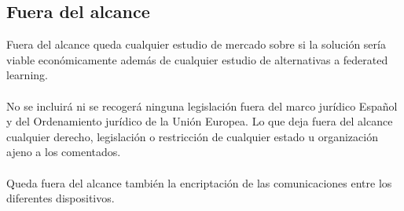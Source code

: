 \subsection{Fuera del alcance}
Fuera del alcance queda cualquier estudio de mercado sobre si la solución sería viable económicamente además de cualquier estudio de alternativas a federated learning. 
\\ \\
No se incluirá ni se recogerá ninguna legislación fuera del marco jurídico Español y del Ordenamiento jurídico de la Unión Europea. Lo que deja fuera del alcance cualquier derecho, legislación o restricción de cualquier estado u organización ajeno a los comentados.
\\ \\
Queda fuera del alcance también la encriptación de las comunicaciones entre los diferentes dispositivos.
\\